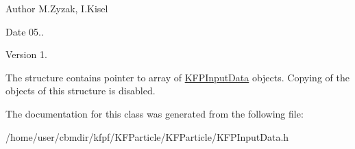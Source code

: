 \begin{DoxyAuthor}{Author}
M.\+Zyzak, I.\+Kisel 
\end{DoxyAuthor}
\begin{DoxyDate}{Date}
05.. 
\end{DoxyDate}
\begin{DoxyVersion}{Version}
1.
\end{DoxyVersion}
The structure contains pointer to array of \hyperlink{classKFPInputData}{K\+F\+P\+Input\+Data} objects. Copying of the objects of this structure is disabled. 

The documentation for this class was generated from the following file\+:\begin{DoxyCompactItemize}
\item 
/home/user/cbmdir/kfpf/\+K\+F\+Particle/\+K\+F\+Particle/K\+F\+P\+Input\+Data.\+h\end{DoxyCompactItemize}
